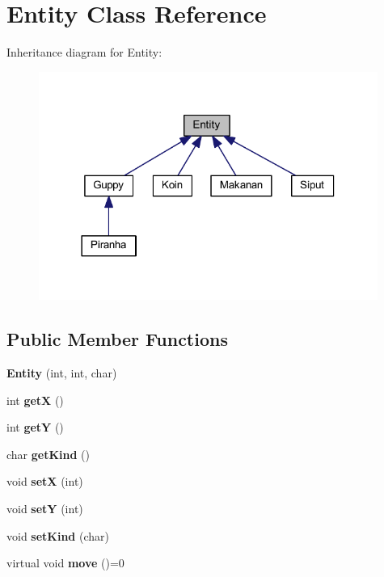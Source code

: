 \hypertarget{class_entity}{}\section{Entity Class Reference}
\label{class_entity}


Inheritance diagram for Entity\+:
\nopagebreak
\begin{figure}[H]
\begin{center}
\leavevmode
\includegraphics[width=314pt]{class_entity__inherit__graph}
\end{center}
\end{figure}
\subsection*{Public Member Functions}
\begin{DoxyCompactItemize}
\item 
\mbox{\label{class_entity_aa7b05b89c1d319f19e06a986f6fcba8e}} 
{\bfseries Entity} (int, int, char)
\item 
\mbox{\label{class_entity_a8bad399d8b9c6bf23ecbb8f0b4fe6a64}} 
int {\bfseries getX} ()
\item 
\mbox{\label{class_entity_a4f2a264033195f9004a494069c5865f0}} 
int {\bfseries getY} ()
\item 
\mbox{\label{class_entity_adef8f8f46bf832bf07fe5b91cc808e3b}} 
char {\bfseries get\+Kind} ()
\item 
\mbox{\label{class_entity_a3fbf5396e39940e060e48e1c298992dc}} 
void {\bfseries setX} (int)
\item 
\mbox{\label{class_entity_a2241bb3600829d1c3f28577fecf739af}} 
void {\bfseries setY} (int)
\item 
\mbox{\label{class_entity_aa9cdd93807cbc1b39e7afc95110deb60}} 
void {\bfseries set\+Kind} (char)
\item 
\mbox{\label{class_entity_a624e85b5e363a70b0a7b2e04912c6cdf}} 
virtual void {\bfseries move} ()=0
\end{DoxyCompactItemize}
